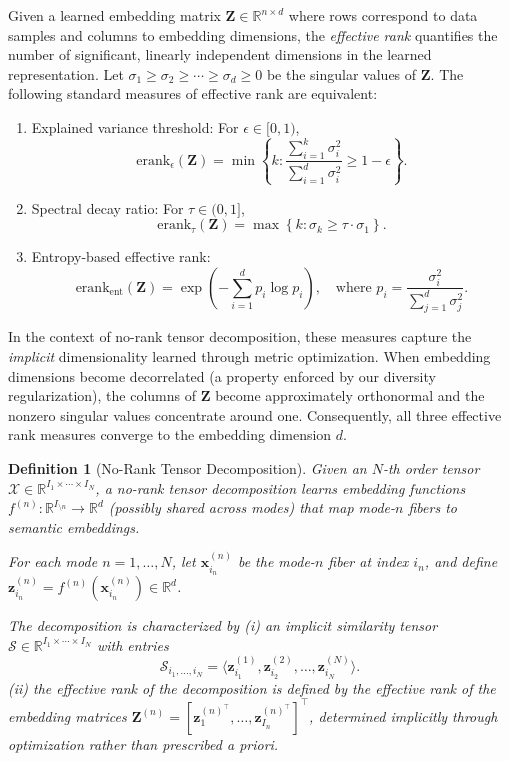 \documentclass[a4paper,12pt,reqno]{amsart}
\newtheorem{definition}[theorem]{\textbf{Definition}}
\theoremstyle{definition}
\theoremstyle{remark}
\begin{document}
		Given a learned embedding matrix $\mathbf{Z} \in \mathbb{R}^{n \times d}$ where rows correspond to data samples and columns to embedding dimensions, the \emph{effective rank} quantifies the number of significant, linearly independent dimensions in the learned representation. Let $\sigma_1 \geq \sigma_2 \geq \cdots \geq \sigma_d \geq 0$ be the singular values of $\mathbf{Z}$.
		The following standard measures of effective rank are equivalent:
		\begin{enumerate}[label=(\roman*)]
			\item {Explained variance threshold:} For $\epsilon \in [0,1)$,
			\[
			\text{erank}_{\epsilon}(\mathbf{Z}) = \min\left\{ k : \frac{\sum_{i=1}^k \sigma_i^2}{\sum_{i=1}^d \sigma_i^2} \geq 1 - \epsilon \right\}.
			\]
			
			\item {Spectral decay ratio:} For $\tau \in (0,1]$,
			\[
			\text{erank}_{\tau}(\mathbf{Z}) = \max\left\{ k : \sigma_k \geq \tau \cdot \sigma_1 \right\}.
			\]
			
			\item {Entropy-based effective rank:}
			\[
			\text{erank}_{\text{ent}}(\mathbf{Z}) = \exp\left(-\sum_{i=1}^d p_i \log p_i\right),
			\quad \text{where } p_i = \frac{\sigma_i^2}{\sum_{j=1}^d \sigma_j^2}.
			\]
		\end{enumerate}
		In the context of no-rank tensor decomposition, these measures capture the \emph{implicit} dimensionality learned through metric optimization. When embedding dimensions become decorrelated (a property enforced by our diversity regularization), 
		the columns of $\mathbf{Z}$ become approximately orthonormal and the nonzero singular values concentrate around one.
		Consequently, all three effective rank measures converge to the embedding dimension $d$.
\begin{definition}[No-Rank Tensor Decomposition]
	Given an $N$-th order tensor $\mathcal{X} \in \mathbb{R}^{I_1 \times \cdots \times I_N}$, 
	a \emph{no-rank tensor decomposition} learns embedding functions $f^{(n)}: \mathbb{R}^{I_{\setminus n}} \to \mathbb{R}^{d}$
	(possibly shared across modes) that map mode-$n$ fibers to semantic embeddings.
	
	For each mode $n = 1,\dots,N$, let $\mathbf{x}_{i_n}^{(n)}$ be the mode-$n$ fiber at index $i_n$,
	and define $\mathbf{z}_{i_n}^{(n)} = f^{(n)}(\mathbf{x}_{i_n}^{(n)}) \in \mathbb{R}^d$.
	
	The decomposition is characterized by (i) an implicit similarity tensor $\mathcal{S} \in \mathbb{R}^{I_1 \times \cdots \times I_N}$ with entries
		\[
		\mathcal{S}_{i_1,\dots,i_N} = \langle \mathbf{z}_{i_1}^{(1)}, \mathbf{z}_{i_2}^{(2)}, \dots, \mathbf{z}_{i_N}^{(N)} \rangle.
		\] (ii) the \emph{effective rank} of the decomposition is defined by the effective rank 
		of the embedding matrices $\mathbf{Z}^{(n)} = [\mathbf{z}_1^{(n)^\top}, \dots, \mathbf{z}_{I_n}^{(n)^\top}]^\top$,
		determined implicitly through optimization rather than prescribed a priori.
\end{definition}
\end{document}
